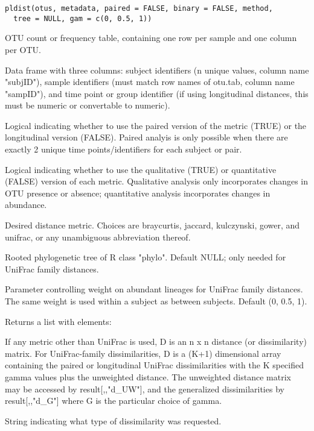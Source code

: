 \documentclass[a4paper]{book}
\begin{document}
%
\begin{Usage}
\begin{verbatim}
pldist(otus, metadata, paired = FALSE, binary = FALSE, method,
  tree = NULL, gam = c(0, 0.5, 1))
\end{verbatim}
\end{Usage}
%
\begin{Arguments}
\begin{ldescription}
\item[\code{otus}] OTU count or frequency table, containing one row per sample and one column per OTU.

\item[\code{metadata}] Data frame with three columns: subject identifiers (n unique values, column name "subjID"), 
sample identifiers (must match row names of otu.tab, column name "sampID"), 
and time point or group identifier (if using longitudinal distances, this must be numeric or 
convertable to numeric).

\item[\code{paired}] Logical indicating whether to use the paired version of the metric (TRUE) or the 
longitudinal version (FALSE). Paired analyis is only possible when there are exactly 2 
unique time points/identifiers for each subject or pair.

\item[\code{binary}] Logical indicating whether to use the qualitative (TRUE) or quantitative (FALSE) 
version of each metric. Qualitative analysis only incorporates changes in OTU presence or 
absence; quantitative analysis incorporates changes in abundance.

\item[\code{method}] Desired distance metric. Choices are braycurtis, jaccard, kulczynski, gower, and 
unifrac, or any unambiguous abbreviation thereof.

\item[\code{tree}] Rooted phylogenetic tree of R class "phylo". Default NULL; only needed for 
UniFrac family distances.

\item[\code{gam}] Parameter controlling weight on abundant lineages for UniFrac family distances. The 
same weight is used within a subject as between subjects. Default (0, 0.5, 1).
\end{ldescription}
\end{Arguments}
%
\begin{Value}
Returns a list with elements: 
\begin{ldescription}
\item[\code{D}] If any metric other than UniFrac is used, D is an n x n distance (or dissimilarity) matrix. 
For UniFrac-family dissimilarities, D is a (K+1) dimensional array containing the paired or 
longitudinal UniFrac dissimilarities with the K specified gamma values plus the unweighted 
distance. The unweighted distance matrix may be accessed by result[,,"d\_UW"], and the 
generalized dissimilarities by result[,,"d\_G"] where G is the particular choice of gamma.
\item[\code{type}] String indicating what type of dissimilarity was requested.
\end{ldescription}
\end{Value}
\end{document}
